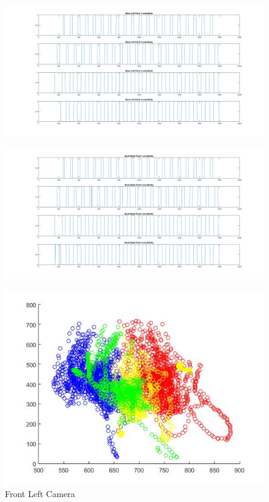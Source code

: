 \newpage
\begin{figure}[H]\captionsetup{width=0.5\linewidth, font=small}  
\includegraphics[height=0.5\textheight, angle=90]{figures/blav.JPG}
\label{fig:blav}
\end{figure}
\newpage
\begin{figure}[H]\captionsetup{width=0.5\linewidth, font=small}  
\includegraphics[height=0.5\textheight, angle=90]{figures/brav.JPG}
\label{fig:brav}
\end{figure}
\newpage
\begin{figure}[H]\captionsetup{width=0.5\linewidth, font=small}  
\includegraphics[width=0.8\linewidth]{figures/fl.JPG}
\caption{Front Left Camera}
\label{fig:fl}
\end{figure}
